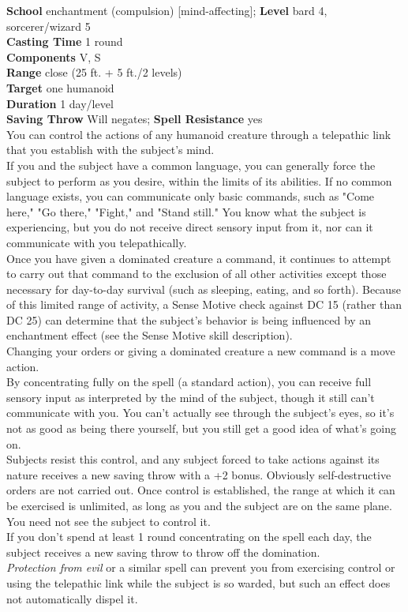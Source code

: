\textbf{School} enchantment (compulsion) [mind-affecting]; \textbf{Level} bard 4, sorcerer/wizard 5\\
\textbf{Casting Time} 1 round\\
\textbf{Components} V, S\\
\textbf{Range} close (25 ft. + 5 ft./2 levels)\\
\textbf{Target} one humanoid\\
\textbf{Duration} 1 day/level\\
\textbf{Saving Throw }Will negates; \textbf{Spell Resistance} yes\\
You can control the actions of any humanoid creature through a telepathic link that you establish with the subject's mind.\\
If you and the subject have a common language, you can generally force the subject to perform as you desire, within the limits of its abilities. If no common language exists, you can communicate only basic commands, such as "Come here," "Go there," "Fight," and "Stand still." You know what the subject is experiencing, but you do not receive direct sensory input from it, nor can it communicate with you telepathically.\\
Once you have given a dominated creature a command, it continues to attempt to carry out that command to the exclusion of all other activities except those necessary for day-to-day survival (such as sleeping, eating, and so forth). Because of this limited range of activity, a Sense Motive check against DC 15 (rather than DC 25) can determine that the subject's behavior is being influenced by an enchantment effect (see the Sense Motive skill description).\\
Changing your orders or giving a dominated creature a new command is a move action.\\
By concentrating fully on the spell (a standard action), you can receive full sensory input as interpreted by the mind of the subject, though it still can't communicate with you. You can't actually see through the subject's eyes, so it's not as good as being there yourself, but you still get a good idea of what's going on.\\
Subjects resist this control, and any subject forced to take actions against its nature receives a new saving throw with a +2 bonus. Obviously self-destructive orders are not carried out. Once control is established, the range at which it can be exercised is unlimited, as long as you and the subject are on the same plane. You need not see the subject to control it.\\
If you don't spend at least 1 round concentrating on the spell each day, the subject receives a new saving throw to throw off the domination.\\
\textit{Protection from evil }or a similar spell can prevent you from exercising control or using the telepathic link while the subject is so warded, but such an effect does not automatically dispel it.\\
